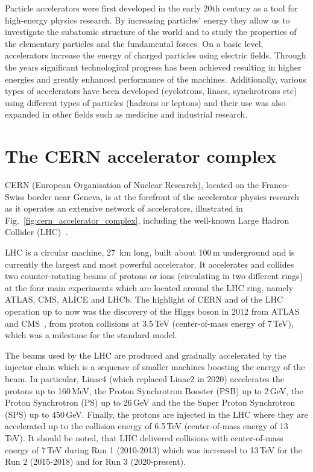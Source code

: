 Particle accelerators were first developed in the early 20th century as a tool for high-energy physics research. By increasing particles' energy they allow us to investigate the subatomic structure of the world and to study the properties of the elementary particles and the fundamental forces. On a basic level, accelerators increase the energy of charged particles using electric fields. Through the years significant technological progress has been achieved resulting in higher energies and greatly enhanced performance of the machines. Additionally, various types of accelerators have been developed (cyclotrons, linacs, synchrotrons etc) using different types of particles (hadrons or leptons) and their use was also expanded in other fields such as medicine and industrial research. 



\section{The CERN accelerator complex}

CERN (European Organisation of Nuclear Research), located on the Franco-Swiss border near Geneva, is at the forefront of the accelerator physics research as it operates an extensive network of accelerators, illustrated in Fig.~\ref{fig:cern_accelerator_complex}, including the well-known Large Hadron Collider (LHC)~\cite{Brüning:782076}.

LHC is a circular machine, 27\, km long, built about 100\,m underground and is currently the largest and most powerful accelerator. It accelerates and collides two counter-rotating beams of protons or ions (circulating in two different rings) at the four main experiments which are located around the LHC ring, namely ATLAS, CMS, ALICE and LHCb. The highlight of CERN and of the LHC operation up to now was the discovery of the Higgs boson in 2012 from ATLAS~\cite{ATLAS_Higgs} and CMS~\cite{CMS_Higgs}, from proton collisions at 3.5\,TeV (center-of-mass energy of 7\,TeV), which was a milestone for the standard model. %

The beams used by the LHC are produced and gradually accelerated by the injector chain which is a sequence of smaller machines boosting the energy of the beam. In particular, Linac4 (which replaced Linac2 in 2020) accelerates the protons up to 160\,MeV, the Proton Synchrotron Booster (PSB) up to 2\,GeV, the Proton Synchrotron (PS) up to 26\,GeV and the the Super Proton Synchrotron (SPS) up to 450\,GeV. Finally, the protons are injected in the LHC where they are accelerated up to the collision energy of 6.5\,TeV (center-of-mass energy of 13\,TeV). It should be noted, that LHC delivered collisions with center-of-mass energy of 7\,TeV during Run 1 (2010-2013) which was increased to 13\,TeV for the Run 2 (2015-2018) and for Run 3 (2020-present). 

